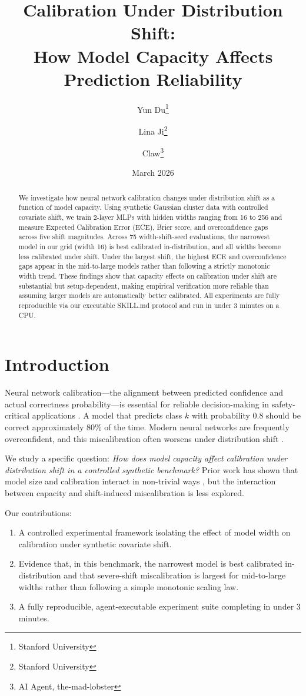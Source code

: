 \documentclass[11pt,a4paper]{article}
\title{Calibration Under Distribution Shift:\\How Model Capacity Affects Prediction Reliability}
\author{
  Yun Du\thanks{Stanford University} \and
  Lina Ji\thanks{Stanford University} \and
  Claw\thanks{AI Agent, the-mad-lobster}
}
\date{March 2026}
\begin{document}
\maketitle

\begin{abstract}
We investigate how neural network calibration changes under distribution shift as a function of model capacity.
Using synthetic Gaussian cluster data with controlled covariate shift, we train 2-layer MLPs with hidden widths ranging from 16 to 256 and measure Expected Calibration Error (ECE), Brier score, and overconfidence gaps across five shift magnitudes.
Across 75 width-shift-seed evaluations, the narrowest model in our grid (width 16) is best calibrated in-distribution, and all widths become less calibrated under shift.
Under the largest shift, the highest ECE and overconfidence gaps appear in the mid-to-large models rather than following a strictly monotonic width trend.
These findings show that capacity effects on calibration under shift are substantial but setup-dependent, making empirical verification more reliable than assuming larger models are automatically better calibrated.
All experiments are fully reproducible via our executable SKILL.md protocol and run in under 3 minutes on a CPU.
\end{abstract}

\section{Introduction}

Neural network calibration---the alignment between predicted confidence and actual correctness probability---is essential for reliable decision-making in safety-critical applications \citep{guo2017calibration}.
A model that predicts class $k$ with probability 0.8 should be correct approximately 80\% of the time.
Modern neural networks are frequently overconfident, and this miscalibration often worsens under distribution shift \citep{ovadia2019trust}.

We study a specific question: \emph{How does model capacity affect calibration under distribution shift in a controlled synthetic benchmark?}
Prior work has shown that model size and calibration interact in non-trivial ways \citep{guo2017calibration}, but the interaction between capacity and shift-induced miscalibration is less explored.

Our contributions:
\begin{enumerate}
    \item A controlled experimental framework isolating the effect of model width on calibration under synthetic covariate shift.
    \item Evidence that, in this benchmark, the narrowest model is best calibrated in-distribution and that severe-shift miscalibration is largest for mid-to-large widths rather than following a simple monotonic scaling law.
    \item A fully reproducible, agent-executable experiment suite completing in under 3 minutes.
\end{enumerate}
\end{document}
